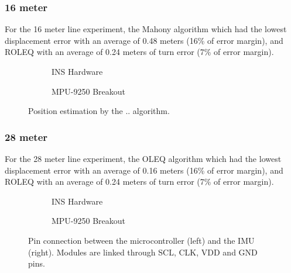 \subsubsection{16 meter}
For the 16 meter line experiment, the Mahony algorithm which had the lowest displacement error with an average of 0.48 meters (16\% of error margin), and ROLEQ with an average of 0.24 meters of turn error (7\% of error margin).

\begin{figure}[!h]
    \centering
    
\end{figure}

\begin{figure}[!h]
    \centering
    \begin{subfigure}{0.49\textwidth}
        \centering
        \resizebox{1\linewidth}{!}{}
        \caption{INS Hardware}
        \label{fig:line16_2D}
    \end{subfigure}
    \begin{subfigure}{0.49\textwidth}
        \centering
        \resizebox{1\linewidth}{!}{}
        \caption{MPU-9250 Breakout}
        \label{fig:line16_3D}
    \end{subfigure}
    \caption{Position estimation by the .. algorithm.}
    \label{fig:line16}
\end{figure}

\subsubsection{28 meter}

For the 28 meter line experiment, the OLEQ algorithm which had the lowest displacement error with an average of 0.16 meters (16\% of error margin), and ROLEQ with an average of 0.24 meters of turn error (7\% of error margin).

\begin{figure}[!h]
    \centering
    
\end{figure}

\begin{figure}[!h]
    \centering
    \begin{subfigure}{0.49\textwidth}
        \centering
        \resizebox{1\linewidth}{!}{}
        \caption{INS Hardware}
        \label{fig:line28_2D}
    \end{subfigure}
    \begin{subfigure}{0.49\textwidth}
        \centering
        \resizebox{1\linewidth}{!}{}
        \caption{MPU-9250 Breakout}
        \label{fig:line28_3D}
    \end{subfigure}
    \caption{Pin connection between the microcontroller (left) and the IMU (right). Modules are linked through SCL, CLK, VDD and GND pins.}
    \label{fig:line28}
\end{figure}

